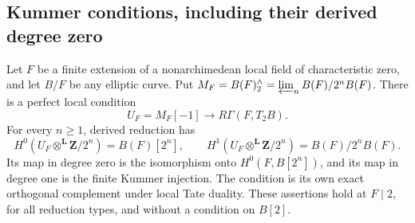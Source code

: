 \subsection{Kummer conditions, including their derived degree zero}

\begin{lemma}\label{rl:kummer}
Let $F$ be a finite extension of a nonarchimedean local field of
characteristic zero, and let $B/F$ be any elliptic curve.  Put
$M_F=B(F)^\wedge_2=\varprojlim_n B(F)/2^nB(F)$.  There is a perfect local
condition
\[
 U_F=M_F[-1]\longrightarrow R\Gamma(F,T_2B).
\]
For every $n\geq1$, derived reduction has
\[
 H^0(U_F\otimes^{\mathbf L}\mathbf Z/2^n)=B(F)[2^n],\qquad
 H^1(U_F\otimes^{\mathbf L}\mathbf Z/2^n)=B(F)/2^nB(F).
\]
Its map in degree zero is the isomorphism onto
$H^0(F,B[2^n])$, and its map in degree one is the finite Kummer injection.
The condition is its own exact orthogonal complement under local Tate
duality.  These assertions hold at $F\mid2$, for all reduction types, and
without a condition on $B[2]$.
\end{lemma}

